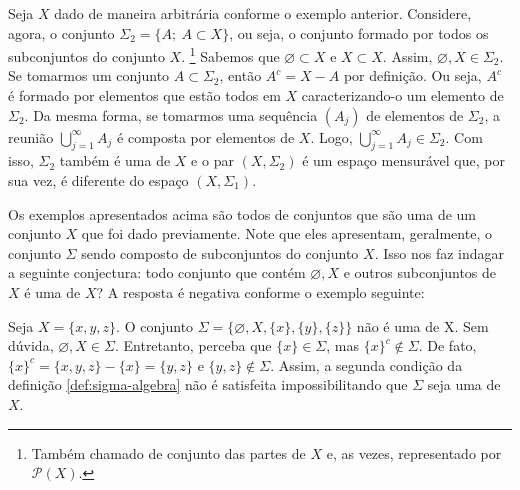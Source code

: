 \begin{example}
\label{ex:sigma-subconjuntos}
Seja $X$ dado de maneira arbitrária conforme o exemplo anterior.
Considere, agora, o conjunto $\Sigma_2 = \{ A; \ A \subset X\}$, ou seja, o conjunto formado por todos os subconjuntos do conjunto $X$.
%
\footnote{Também chamado de conjunto das partes de $X$ e, as vezes, representado por $\mathcal{P}(X)$.}
%
Sabemos que $\varnothing \subset X$ e $X \subset X$. 
Assim, $\varnothing, X \in \Sigma_2$. 
Se tomarmos um conjunto $A \subset \Sigma_2$, então $A^c = X - A$ por definição.
Ou seja, $A^c$ é formado por elementos que estão todos em $X$ caracterizando-o um elemento de $\Sigma_2$.
Da mesma forma, se tomarmos uma sequência $(A_j)$ de elementos de $\Sigma_2$, a reunião 
$\displaystyle \bigcup_{j = 1}^\infty A_j$ é composta por elementos de $X$.
Logo,  $\displaystyle \bigcup_{j = 1}^\infty A_j \in \Sigma_2$.
Com isso, $\Sigma_2$ também é uma \sigal de $X$ e o par $(X, \Sigma_2)$ é um espaço mensurável que, por sua vez, é diferente do espaço $(X,\Sigma_1)$.
\end{example}




Os exemplos apresentados acima são todos de conjuntos que são uma \sigal de um conjunto $X$ que foi dado previamente.
Note que eles apresentam, geralmente, o conjunto $\Sigma$ sendo composto de subconjuntos do conjunto $X$. 
Isso nos faz indagar a seguinte conjectura: todo conjunto que contém $\varnothing, X$ e outros subconjuntos de $X$ é uma \sigal de $X$? A resposta é negativa conforme o exemplo seguinte:

\begin{counterexample}
    Seja $X = \{x,y,z\}$. O conjunto $\Sigma = \{\varnothing, X, \{x\}, \{y\}, \{z\}\}$ não é uma \sigal de X.
    Sem dúvida, $\varnothing, X \in \Sigma$. 
    Entretanto, perceba que $\{x\} \in \Sigma$, mas $\{x\}^c \notin \Sigma$.
    De fato, $\{x\}^c =\{x,y,z\} -\{x\} = \{y,z\}$ e $\{y,z\} \notin \Sigma$.
    Assim, a segunda condição da definição \ref{def:sigma-algebra} não é satisfeita impossibilitando que $\Sigma$ seja uma \sigal de $X$.
    
\end{counterexample}

